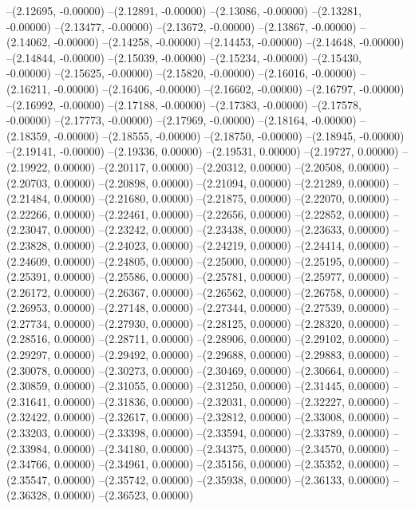 --(2.12695, -0.00000)
--(2.12891, -0.00000)
--(2.13086, -0.00000)
--(2.13281, -0.00000)
--(2.13477, -0.00000)
--(2.13672, -0.00000)
--(2.13867, -0.00000)
--(2.14062, -0.00000)
--(2.14258, -0.00000)
--(2.14453, -0.00000)
--(2.14648, -0.00000)
--(2.14844, -0.00000)
--(2.15039, -0.00000)
--(2.15234, -0.00000)
--(2.15430, -0.00000)
--(2.15625, -0.00000)
--(2.15820, -0.00000)
--(2.16016, -0.00000)
--(2.16211, -0.00000)
--(2.16406, -0.00000)
--(2.16602, -0.00000)
--(2.16797, -0.00000)
--(2.16992, -0.00000)
--(2.17188, -0.00000)
--(2.17383, -0.00000)
--(2.17578, -0.00000)
--(2.17773, -0.00000)
--(2.17969, -0.00000)
--(2.18164, -0.00000)
--(2.18359, -0.00000)
--(2.18555, -0.00000)
--(2.18750, -0.00000)
--(2.18945, -0.00000)
--(2.19141, -0.00000)
--(2.19336, 0.00000)
--(2.19531, 0.00000)
--(2.19727, 0.00000)
--(2.19922, 0.00000)
--(2.20117, 0.00000)
--(2.20312, 0.00000)
--(2.20508, 0.00000)
--(2.20703, 0.00000)
--(2.20898, 0.00000)
--(2.21094, 0.00000)
--(2.21289, 0.00000)
--(2.21484, 0.00000)
--(2.21680, 0.00000)
--(2.21875, 0.00000)
--(2.22070, 0.00000)
--(2.22266, 0.00000)
--(2.22461, 0.00000)
--(2.22656, 0.00000)
--(2.22852, 0.00000)
--(2.23047, 0.00000)
--(2.23242, 0.00000)
--(2.23438, 0.00000)
--(2.23633, 0.00000)
--(2.23828, 0.00000)
--(2.24023, 0.00000)
--(2.24219, 0.00000)
--(2.24414, 0.00000)
--(2.24609, 0.00000)
--(2.24805, 0.00000)
--(2.25000, 0.00000)
--(2.25195, 0.00000)
--(2.25391, 0.00000)
--(2.25586, 0.00000)
--(2.25781, 0.00000)
--(2.25977, 0.00000)
--(2.26172, 0.00000)
--(2.26367, 0.00000)
--(2.26562, 0.00000)
--(2.26758, 0.00000)
--(2.26953, 0.00000)
--(2.27148, 0.00000)
--(2.27344, 0.00000)
--(2.27539, 0.00000)
--(2.27734, 0.00000)
--(2.27930, 0.00000)
--(2.28125, 0.00000)
--(2.28320, 0.00000)
--(2.28516, 0.00000)
--(2.28711, 0.00000)
--(2.28906, 0.00000)
--(2.29102, 0.00000)
--(2.29297, 0.00000)
--(2.29492, 0.00000)
--(2.29688, 0.00000)
--(2.29883, 0.00000)
--(2.30078, 0.00000)
--(2.30273, 0.00000)
--(2.30469, 0.00000)
--(2.30664, 0.00000)
--(2.30859, 0.00000)
--(2.31055, 0.00000)
--(2.31250, 0.00000)
--(2.31445, 0.00000)
--(2.31641, 0.00000)
--(2.31836, 0.00000)
--(2.32031, 0.00000)
--(2.32227, 0.00000)
--(2.32422, 0.00000)
--(2.32617, 0.00000)
--(2.32812, 0.00000)
--(2.33008, 0.00000)
--(2.33203, 0.00000)
--(2.33398, 0.00000)
--(2.33594, 0.00000)
--(2.33789, 0.00000)
--(2.33984, 0.00000)
--(2.34180, 0.00000)
--(2.34375, 0.00000)
--(2.34570, 0.00000)
--(2.34766, 0.00000)
--(2.34961, 0.00000)
--(2.35156, 0.00000)
--(2.35352, 0.00000)
--(2.35547, 0.00000)
--(2.35742, 0.00000)
--(2.35938, 0.00000)
--(2.36133, 0.00000)
--(2.36328, 0.00000)
--(2.36523, 0.00000)
